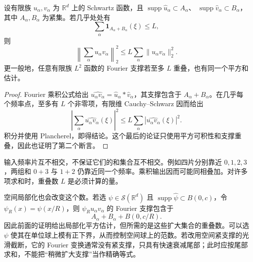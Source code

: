 \begin{proposition}[输出频率和的有限重叠]\label{b2:prop:25-output-overlap}
设有限族 \(u_\alpha,v_\alpha\) 为 \(\mathbb R^d\) 上的 Schwartz 函数，且
\(\operatorname{supp}\widehat u_\alpha\subset A_\alpha\)、
\(\operatorname{supp}\widehat v_\alpha\subset B_\alpha\)，其中 \(A_\alpha,B_\alpha\) 为紧集。若几乎处处有
\[
 \sum_\alpha\mathbf1_{A_\alpha+B_\alpha}(\xi)\leq L,
\]
则
\[
 \left\|\sum_\alpha u_\alpha v_\alpha\right\|_2^2
 \leq L\sum_\alpha\|u_\alpha v_\alpha\|_2^2.
\]
更一般地，任意有限族 \(L^2\) 函数的 Fourier 支撑若至多 \(L\) 重叠，也有同一个平方和估计。
\end{proposition}
\begin{proof}
Fourier 乘积公式给出
\(\widehat{u_\alpha v_\alpha}=\widehat u_\alpha*\widehat v_\alpha\)，其支撑包含于 \(A_\alpha+B_\alpha\)。在几乎每个频率点，至多有 \(L\) 个非零项，有限维 Cauchy--Schwarz 因而给出
\[
 \left|\sum_\alpha\widehat{u_\alpha v_\alpha}(\xi)\right|^2
 \leq L\sum_\alpha|\widehat{u_\alpha v_\alpha}(\xi)|^2.
\]
积分并使用 Plancherel，即得结论。这个最后的论证只使用平方可积性和支撑重叠，因此也证明了第二个断言。
\end{proof}

输入频率片互不相交，不保证它们的和集合互不相交。例如四片分别靠近 \(0,1,2,3\)，两组和 \(0+3\) 与 \(1+2\) 仍靠近同一个频率。乘积输出因而可能同相叠加。对许多项求和时，重叠数 \(L\) 是必须计算的量。

\ProseParagraphBreak

空间局部化也会改变这个数。若选 \(\psi\in\mathcal S(\mathbb R^d)\) 且 \(\operatorname{supp}\widehat\psi\subset B(0,c)\)，令 \(\psi_R(x)=\psi(x/R)\)，则 \(\psi_Ru_\alpha v_\alpha\) 的 Fourier 支撑包含于
\[
 A_\alpha+B_\alpha+B(0,c/R).
\]
因此前面的证明给出局部化平方估计，但所需的是这些扩大集合的重叠数。可以选 \(\psi\) 使其在单位球上模有正下界，从而控制空间球上的范数。若改用空间紧支撑的光滑截断，它的 Fourier 变换通常没有紧支撑，只具有快速衰减尾部；此时应按尾部求和，不能把“稍微扩大支撑”当作精确等式。
